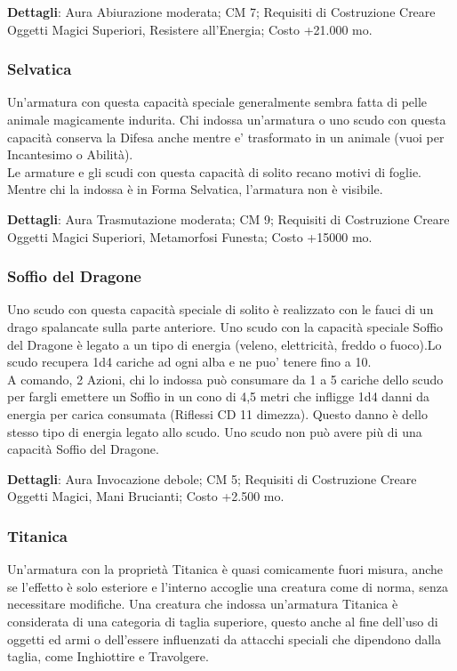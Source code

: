 \begin{multicols}{2}
\textbf{Dettagli}: Aura Abiurazione moderata; CM 7; Requisiti di Costruzione Creare Oggetti Magici Superiori, Resistere all'Energia; Costo +21.000 mo.

\subsubsection{Selvatica}

Un'armatura con questa capacità speciale generalmente sembra fatta di pelle animale magicamente indurita. Chi indossa un'armatura o uno scudo con questa capacità conserva la Difesa anche mentre e' trasformato in un animale (vuoi per Incantesimo o Abilità).\\
Le armature e gli scudi con questa capacità di solito recano motivi di foglie. Mentre chi la indossa è in Forma Selvatica, l'armatura non è visibile.

\textbf{Dettagli}: Aura Trasmutazione moderata; CM 9; Requisiti di Costruzione Creare Oggetti Magici Superiori, Metamorfosi Funesta; Costo +15000 mo.

\subsubsection{Soffio del Dragone}

Uno scudo con questa capacità speciale di solito è realizzato con le fauci di un drago spalancate sulla parte anteriore. Uno scudo con la capacità speciale Soffio del Dragone è legato a un tipo di energia (veleno, elettricità, freddo o fuoco).Lo scudo recupera 1d4 cariche ad ogni alba e ne puo' tenere fino a 10. \\
A comando, 2 Azioni, chi lo indossa può consumare da 1 a 5 cariche dello scudo per fargli emettere un Soffio in un cono di 4,5 metri che infligge 1d4 danni da energia per carica consumata (Riflessi CD 11 dimezza). Questo danno è dello stesso tipo di energia legato allo scudo. Uno scudo non può avere più di una capacità Soffio del Dragone.

\textbf{Dettagli}: Aura Invocazione debole; CM 5; Requisiti di Costruzione Creare Oggetti Magici, Mani Brucianti; Costo +2.500 mo.

\subsubsection{Titanica}

Un'armatura con la proprietà Titanica è quasi comicamente fuori misura, anche se l'effetto è solo esteriore e l'interno accoglie una creatura come di norma, senza necessitare modifiche. Una creatura che indossa un'armatura Titanica è considerata di una categoria di taglia superiore, questo anche al fine dell'uso di oggetti ed armi o dell'essere influenzati da attacchi speciali che dipendono dalla taglia, come Inghiottire e Travolgere.\\


\end{multicols}
